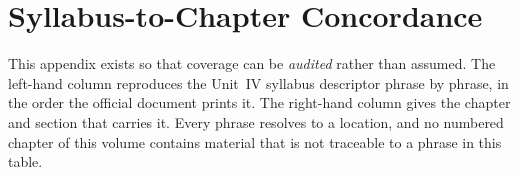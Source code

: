 
\startappendices

\chapter{Syllabus-to-Chapter Concordance}

This appendix exists so that coverage can be \emph{audited} rather than assumed.
The left-hand column reproduces the Unit~IV syllabus descriptor phrase by phrase,
in the order the official document prints it. The right-hand column gives the
chapter and section that carries it. Every phrase resolves to a location, and no
numbered chapter of this volume contains material that is not traceable to a
phrase in this table.

